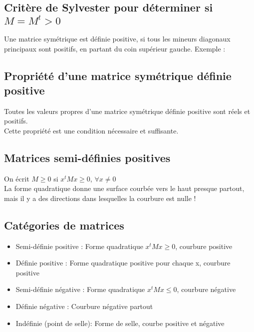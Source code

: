 \documentclass[document.tex]{subfiles}
\begin{document}
\subsection{Critère de Sylvester pour déterminer si $M = M^t > 0$}

Une matrice symétrique est définie positive, si tous les mineurs diagonaux principaux sont positifs, en partant du coin supérieur gauche. Exemple :


\subsection{Propriété d'une matrice symétrique définie positive}

Toutes les valeurs propres d'une matrice symétrique définie positive sont réels et positifs.\\

Cette propriété est une condition nécessaire et suffisante.

\subsection{Matrices semi-définies positives}

On écrit $ M \geq 0$  si  $x^t M x \geq 0$,  $\forall x \neq 0$ \\

La forme quadratique donne une surface courbée vers le haut presque partout, mais il y a des directions dans lesquelles la courbure est nulle !


\subsection{Catégories de matrices}

\begin{itemize}
\item Semi-définie positive : Forme quadratique $x^t M x \geq 0$, courbure positive
\item Définie positive : Forme quadratique positive pour chaque x, courbure positive
\item Semi-définie négative : Forme quadratique $x^t M x \leq 0$, courbure négative
\item Définie négative : Courbure négative partout
\item Indéfinie (point de selle): Forme de selle, courbe positive et négative
\end{itemize}
\end{document}
